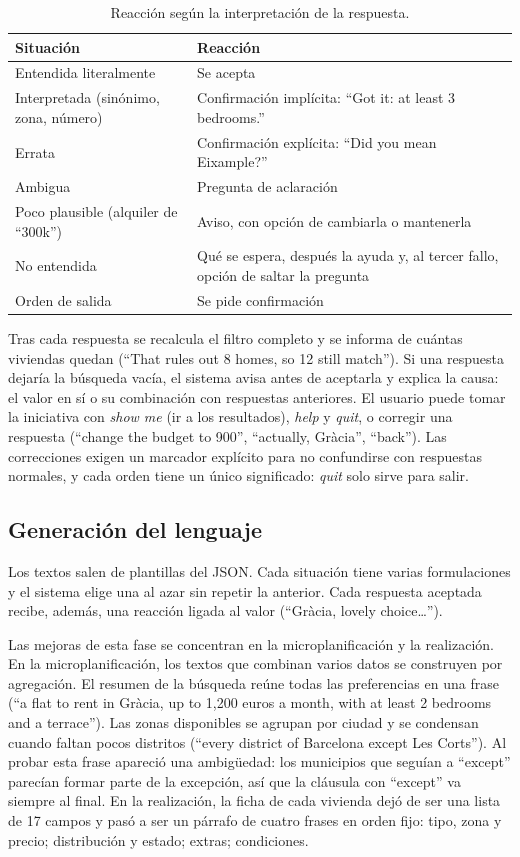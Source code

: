 \documentclass[10pt,a4paper]{article}
\begin{document}
\begin{table}[ht]
\centering\small
\caption{Reacción según la interpretación de la respuesta.}
\label{tab:reacciones}
\begin{tabularx}{\textwidth}{@{}>{\raggedright\arraybackslash}p{5.2cm}L@{}}
\toprule
Situación & Reacción \\
\midrule
Entendida literalmente & Se acepta \\
Interpretada (sinónimo, zona, número) & Confirmación implícita: ``Got it: at least 3 bedrooms.'' \\
Errata & Confirmación explícita: ``Did you mean Eixample?'' \\
Ambigua & Pregunta de aclaración \\
Poco plausible (alquiler de ``300k'') & Aviso, con opción de cambiarla o mantenerla \\
No entendida & Qué se espera, después la ayuda y, al tercer fallo, opción de saltar la pregunta \\
Orden de salida & Se pide confirmación \\
\bottomrule
\end{tabularx}
\end{table}

Tras cada respuesta se recalcula el filtro completo y se informa de cuántas viviendas quedan (``That rules out 8 homes, so 12 still match''). Si una respuesta dejaría la búsqueda vacía, el sistema avisa antes de aceptarla y explica la causa: el valor en sí o su combinación con respuestas anteriores. El usuario puede tomar la iniciativa con \emph{show me} (ir a los resultados), \emph{help} y \emph{quit}, o corregir una respuesta (``change the budget to 900'', ``actually, Gràcia'', ``back''). Las correcciones exigen un marcador explícito para no confundirse con respuestas normales, y cada orden tiene un único significado: \emph{quit} solo sirve para salir.

\subsection{Generación del lenguaje}

Los textos salen de plantillas del JSON. Cada situación tiene varias formulaciones y el sistema elige una al azar sin repetir la anterior. Cada respuesta aceptada recibe, además, una reacción ligada al valor (``Gràcia, lovely choice\ldots'').

Las mejoras de esta fase se concentran en la microplanificación y la realización. En la microplanificación, los textos que combinan varios datos se construyen por agregación. El resumen de la búsqueda reúne todas las preferencias en una frase (``a flat to rent in Gràcia, up to 1,200 euros a month, with at least 2 bedrooms and a terrace''). Las zonas disponibles se agrupan por ciudad y se condensan cuando faltan pocos distritos (``every district of Barcelona except Les Corts''). Al probar esta frase apareció una ambigüedad: los municipios que seguían a ``except'' parecían formar parte de la excepción, así que la cláusula con ``except'' va siempre al final. En la realización, la ficha de cada vivienda dejó de ser una lista de 17 campos y pasó a ser un párrafo de cuatro frases en orden fijo: tipo, zona y precio; distribución y estado; extras; condiciones.
\end{document}
